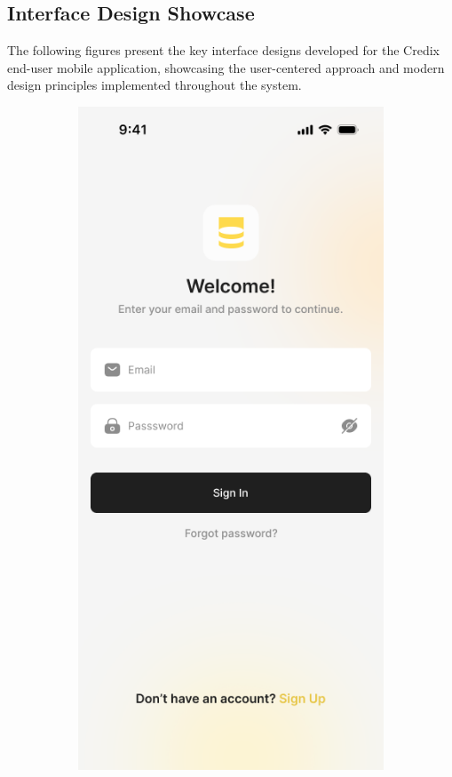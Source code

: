\subsection{Interface Design Showcase}

The following figures present the key interface designs developed for the Credix end-user mobile application, showcasing the user-centered approach and modern design principles implemented throughout the system.

\begin{figure}[H]
    \centering
    \begin{subfigure}[b]{0.32\textwidth}
        \centering
        \includegraphics[width=\textwidth]{images/sign_in_screen.png}

\end{subfigure}
\end{figure}
